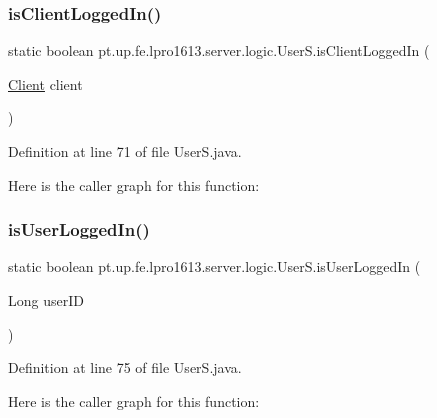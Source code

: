 \subsubsection{\texorpdfstring{is\+Client\+Logged\+In()}{isClientLoggedIn()}}
{\footnotesize\ttfamily static boolean pt.\+up.\+fe.\+lpro1613.\+server.\+logic.\+User\+S.\+is\+Client\+Logged\+In (\begin{DoxyParamCaption}\item[{\hyperlink{classpt_1_1up_1_1fe_1_1lpro1613_1_1server_1_1conn_1_1_client}{Client}}]{client }\end{DoxyParamCaption})\hspace{0.3cm}{\ttfamily [static]}}



Definition at line 71 of file User\+S.\+java.

Here is the caller graph for this function\+:
\hypertarget{classpt_1_1up_1_1fe_1_1lpro1613_1_1server_1_1logic_1_1_user_s_af0725775fa11525afa9299d198d69b2a}{}\label{classpt_1_1up_1_1fe_1_1lpro1613_1_1server_1_1logic_1_1_user_s_af0725775fa11525afa9299d198d69b2a} 
\subsubsection{\texorpdfstring{is\+User\+Logged\+In()}{isUserLoggedIn()}}
{\footnotesize\ttfamily static boolean pt.\+up.\+fe.\+lpro1613.\+server.\+logic.\+User\+S.\+is\+User\+Logged\+In (\begin{DoxyParamCaption}\item[{Long}]{user\+ID }\end{DoxyParamCaption})\hspace{0.3cm}{\ttfamily [static]}}



Definition at line 75 of file User\+S.\+java.

Here is the caller graph for this function\+:
\hypertarget{classpt_1_1up_1_1fe_1_1lpro1613_1_1server_1_1logic_1_1_user_s_a9c89c0a0ef730b38021033e58f7911cd}{}\label{classpt_1_1up_1_1fe_1_1lpro1613_1_1server_1_1logic_1_1_user_s_a9c89c0a0ef730b38021033e58f7911cd} 
